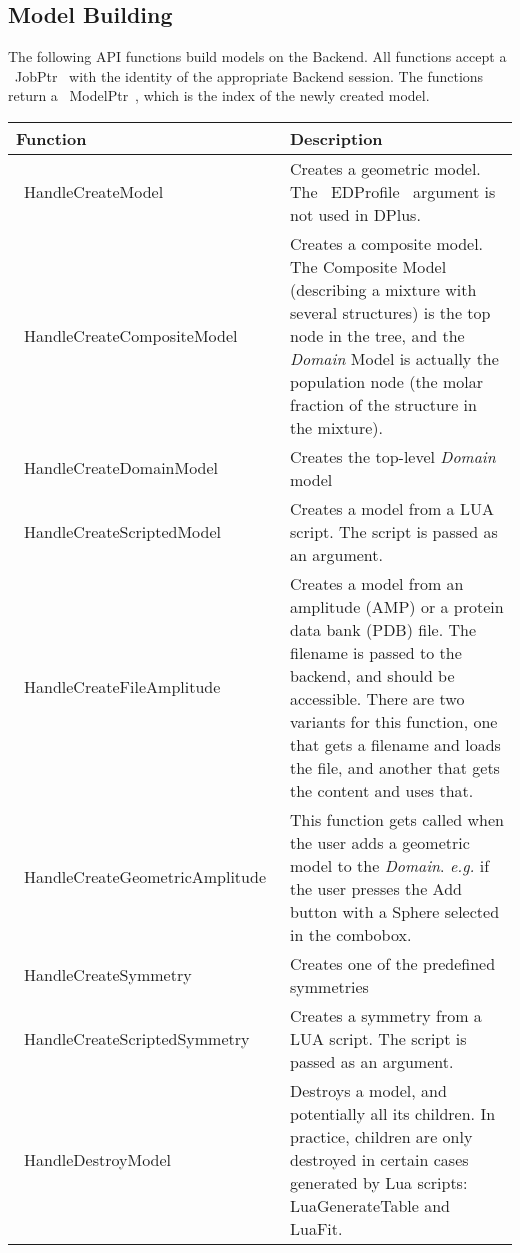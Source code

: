 \documentclass[12pt]{article}
\begin{document}
\subsection{Model Building}
The following API functions build models on the Backend. All functions accept a ~JobPtr~ with the identity of the appropriate Backend session. The functions return a ~ModelPtr~, which is the index of the newly created model.

\begin{center}
	\begin{longtable}{|l|p{7cm}|}
		\hline
		\textbf{Function} & \textbf{Description} \\ \hline
		~HandleCreateModel~ & Creates a geometric model. The ~EDProfile~ argument is not used in DPlus. \\ \hline
		~HandleCreateCompositeModel~ & Creates a composite model. The Composite Model (describing a mixture with several structures) is the top node in the tree, and the \emph{Domain} Model is actually the population node (the molar fraction of the structure in the mixture). \\ \hline 
		~HandleCreateDomainModel~ & Creates the top-level \emph{Domain} model \\ \hline
		~HandleCreateScriptedModel~ & Creates a model from a LUA script. The script is passed as an argument. \\ \hline
		~HandleCreateFileAmplitude~ & Creates a model from an amplitude (AMP) or a protein data bank (PDB) file. The filename is passed to the backend, and should be accessible. There are two variants for this function, one that gets a filename and loads the file, and another that gets the content and uses that. \\ \hline 
		~HandleCreateGeometricAmplitude~ & This function gets called when the user adds a geometric model to the \emph{Domain}. \textit{e.g.} if the user presses the Add button with a Sphere selected in the combobox. \\ \hline 
		~HandleCreateSymmetry~ & Creates one of the predefined symmetries \\ \hline
		~HandleCreateScriptedSymmetry~ & Creates a symmetry from a LUA script. The script is passed as an argument. \\ \hline
		~HandleDestroyModel~ & Destroys a model, and potentially all its children. In practice, children are only destroyed in certain cases generated by Lua scripts: LuaGenerateTable and LuaFit.\\ \hline
	\end{longtable}
\end{center}
\end{document}
